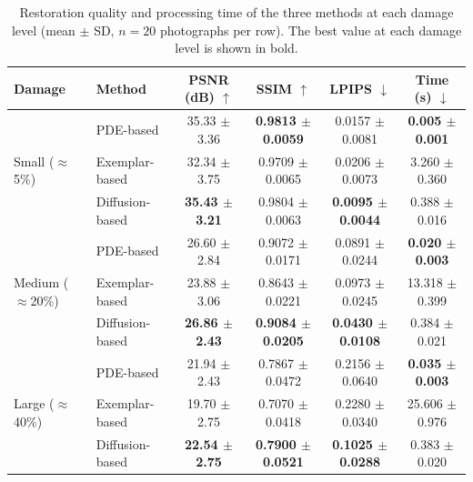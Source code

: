 \documentclass[conference]{IEEEtran}
\begin{document}
\begin{table}[!b]
  \centering
  \renewcommand{\arraystretch}{1.15}
  \begin{tabular}{llcccc}
    \toprule
    Damage & Method & PSNR (dB) $\uparrow$ & SSIM $\uparrow$ & LPIPS $\downarrow$ & Time (s) $\downarrow$ \\
    \midrule
    \multirow{3}{*}{Small ($\approx$5\%)}
      & PDE-based       & 35.33 $\pm$ 3.36 & \textbf{0.9813 $\pm$ 0.0059} & 0.0157 $\pm$ 0.0081 & \textbf{0.005 $\pm$ 0.001} \\
      & Exemplar-based  & 32.34 $\pm$ 3.75 & 0.9709 $\pm$ 0.0065 & 0.0206 $\pm$ 0.0073 & 3.260 $\pm$ 0.360 \\
      & Diffusion-based & \textbf{35.43 $\pm$ 3.21} & 0.9804 $\pm$ 0.0063 & \textbf{0.0095 $\pm$ 0.0044} & 0.388 $\pm$ 0.016 \\
    \midrule
    \multirow{3}{*}{Medium ($\approx$20\%)}
      & PDE-based       & 26.60 $\pm$ 2.84 & 0.9072 $\pm$ 0.0171 & 0.0891 $\pm$ 0.0244 & \textbf{0.020 $\pm$ 0.003} \\
      & Exemplar-based  & 23.88 $\pm$ 3.06 & 0.8643 $\pm$ 0.0221 & 0.0973 $\pm$ 0.0245 & 13.318 $\pm$ 0.399 \\
      & Diffusion-based & \textbf{26.86 $\pm$ 2.43} & \textbf{0.9084 $\pm$ 0.0205} & \textbf{0.0430 $\pm$ 0.0108} & 0.384 $\pm$ 0.021 \\
    \midrule
    \multirow{3}{*}{Large ($\approx$40\%)}
      & PDE-based       & 21.94 $\pm$ 2.43 & 0.7867 $\pm$ 0.0472 & 0.2156 $\pm$ 0.0640 & \textbf{0.035 $\pm$ 0.003} \\
      & Exemplar-based  & 19.70 $\pm$ 2.75 & 0.7070 $\pm$ 0.0418 & 0.2280 $\pm$ 0.0340 & 25.606 $\pm$ 0.976 \\
      & Diffusion-based & \textbf{22.54 $\pm$ 2.75} & \textbf{0.7900 $\pm$ 0.0521} & \textbf{0.1025 $\pm$ 0.0288} & 0.383 $\pm$ 0.020 \\
    \bottomrule
  \end{tabular}
  \vspace{4pt}
  \caption{Restoration quality and processing time of the three methods at each damage level (mean $\pm$ SD, $n = 20$ photographs per row). The best value at each damage level is shown in bold.}
  \label{tab:main}
\end{table}
\end{document}
